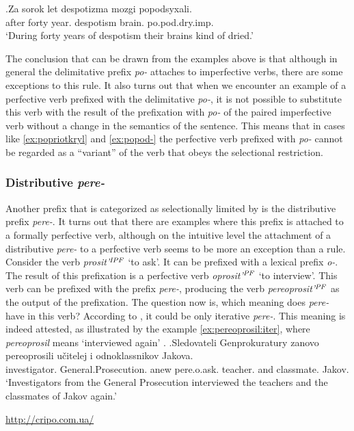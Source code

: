 \exg.\label{ex:popod-imp}Za sorok let despotizma mozgi popodsyxali.\\
after forty year. despotism brain. po.pod.dry.imp.\\
\vspace{0.5em}
`During forty years of despotism their brains kind of dried.'

The conclusion that can be drawn from the examples above is that although in general the delimitative prefix \textit{po-} attaches to imperfective verbs, there are some exceptions to this rule. It also turns out that when we encounter an example of a perfective verb prefixed with the delimitative \textit{po-}, it is not possible to substitute this verb with the result of the prefixation with \textit{po-} of the paired imperfective verb without a change in the semantics of the sentence. This means that in cases like \ref{ex:popriotkryl} and \ref{ex:popod-} the perfective verb prefixed with \textit{po-} cannot be regarded as a ``variant'' of the verb that obeys the selectional restriction.
 
\subsubsection{Distributive \textit{pere-}}
Another prefix that is categorized as selectionally limited by \citet{Tatevosov:09} is the distributive prefix \textit{pere-}. It turns out that there are examples where this prefix is attached to a formally perfective verb, although on the intuitive level the attachment of a distributive \textit{pere-} to a perfective verb seems to be more an exception than a rule. Consider the verb \textit{prosit'}$^{\mathit{IPF}}$ `to ask'. It can be prefixed with a lexical prefix \textit{o-}. The result of this prefixation is a perfective verb \textit{oprosit'}$^{\mathit{PF}}$ `to interview'. This verb can be prefixed with the prefix \textit{pere-}, producing the verb \textit{pereoprosit'}$^{\mathit{PF}}$ as the output of the prefixation. The question now is, which meaning does \textit{pere-} have in this verb? According to \citet{Tatevosov:09}, it could be only iterative \textit{pere-}. This meaning is indeed attested, as illustrated by the example \ref{ex:pereoprosil:iter}, where \textit{pereoprosil} means `interviewed again'
.
\exg.\label{ex:pereoprosil:iter}Sledovateli Genprokuratury zanovo pereoprosili u\v{c}itelej i odnoklassnikov Jakova.\\
investigator. General.Prosecution. anew pere.o.ask. teacher. and classmate. Jakov.\\
\vspace{0.5em}
`Investigators from the General Prosecution interviewed the teachers and the classmates of Jakov again.'
\begin{flushright}
\vspace{-1em}
\url{http://cripo.com.ua/}
\end{flushright}


